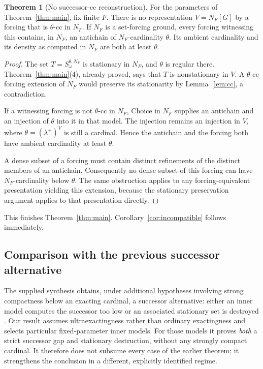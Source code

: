 \documentclass[11pt,letterpaper]{article}
\theoremstyle{definition}
\newtheorem{theorem}[definition]{Theorem}
\numberwithin{equation}{section}
\begin{document}
\begin{theorem}[No successor-cc reconstruction]\label{thm:ground}
For the parameters of Theorem~\ref{thm:main}, fix finite $F$. There is no representation $V=N_F[G]$ by a forcing that is $\theta$-cc in $N_F$. If $N_F$ is a set-forcing ground, every forcing witnessing this contains, in $N_F$, an antichain of $N_F$-cardinality $\theta$. Its ambient cardinality and its density as computed in $N_F$ are both at least $\theta$.
\end{theorem}

\begin{proof}
The set $T=S_\omega^{\theta,N_F}$ is stationary in $N_F$, and $\theta$ is regular there. Theorem~\ref{thm:main}(4), already proved, says that $T$ is nonstationary in $V$. A $\theta$-cc forcing extension of $N_F$ would preserve its stationarity by Lemma~\ref{lem:cc}, a contradiction.

If a witnessing forcing is not $\theta$-cc in $N_F$, Choice in $N_F$ supplies an antichain and an injection of $\theta$ into it in that model. The injection remains an injection in $V$, where $\theta=(\lambda^+)^V$ is still a cardinal. Hence the antichain and the forcing both have ambient cardinality at least $\theta$.

A dense subset of a forcing must contain distinct refinements of the distinct members of an antichain. Consequently no dense subset of this forcing can have $N_F$-cardinality below $\theta$. The same obstruction applies to any forcing-equivalent presentation yielding this extension, because the stationary preservation argument applies to that presentation directly.
\end{proof}

This finishes Theorem~\ref{thm:main}. Corollary~\ref{cor:incompatible} follows immediately.

\subsection{Comparison with the previous successor alternative}

The supplied synthesis obtains, under additional hypotheses involving strong compactness below an exacting cardinal, a successor alternative: either an inner model computes the successor too low or an associated stationary set is destroyed \cite[Section~7, second-round refinements]{synthesis}. Our result assumes ultraexactingness rather than ordinary exactingness and selects particular fixed-parameter inner models. For those models it proves \emph{both} a strict successor gap and stationary destruction, without any strongly compact cardinal. It therefore does not subsume every case of the earlier theorem; it strengthens the conclusion in a different, explicitly identified regime.
\end{document}
